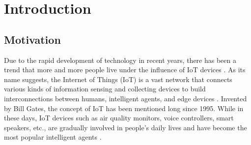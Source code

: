 \documentclass[msc,deptreport,ai]{infthesis}      %
\begin{document}
\chapter{Introduction}








\section{Motivation}

Due to the rapid development of technology in recent years, there has been a trend that more and more people live under the influence of IoT devices \cite{Kumar}. As its name suggests, the Internet of Things (IoT) is a vast network that connects various kinds of information sensing and collecting devices to build interconnections between humans, intelligent agents, and edge devices \cite{IoT}. Invented by Bill Gates, the concept of IoT has been mentioned long since 1995. While in these days, IoT devices such as air quality monitors, voice controllers, smart speakers, etc., are gradually involved in people's daily lives and have become the most popular intelligent agents \cite{IoTdevice}.
\end{document}
